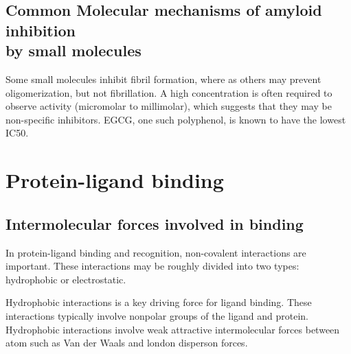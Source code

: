\subsection{Common Molecular mechanisms of amyloid inhibition 
	            \\ by small molecules}
Some small molecules inhibit fibril formation, where as others may prevent oligomerization, but not fibrillation. A high concentration is often required to observe activity (micromolar to millimolar), which suggests that they may be non-specific inhibitors. EGCG, one such polyphenol, is known to have the lowest IC50.

\section{Protein-ligand binding}

\subsection{Intermolecular forces involved in binding}

In protein-ligand binding and recognition, non-covalent interactions are important.  These interactions may be roughly divided into two types: hydrophobic or electrostatic.  

Hydrophobic interactions is a key driving force for ligand binding.  These interactions typically involve nonpolar groups of the ligand and protein. Hydrophobic interactions involve weak attractive intermolecular forces between atom such as Van der Waals and london disperson forces. %

